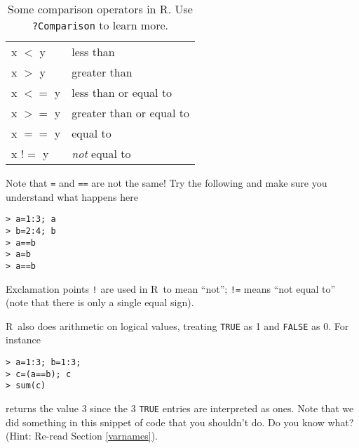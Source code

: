 \documentclass [11pt]{article}
\newcommand{\code}[1]{{\tt #1}}
\newcommand\R{{\sf R}}
\numberwithin{exercise}{section}
\begin{document}
\begin{table} [t]
\begin{tabular}{p{120pt}p{200pt}}
\hline
x $<$ y  & less than    \\
x $>$ y  & greater than \\
x $<=$ y & less than or equal to \\
x $>=$ y & greater than or equal to \\
x $==$ y & equal to \\
x $!=$ y & \emph{not} equal to \\
\hline 
\end{tabular}
\caption{Some comparison operators in \R. Use \code{?Comparison} to learn more.}
\label{Comparisons}
\end{table}

Note that \code{=} and \code{==} are not the same! Try the following and make sure you understand what happens here
\vspace{-0.1in}
\begin{verbatim}
> a=1:3; a
> b=2:4; b
> a==b
> a=b
> a==b
\end{verbatim}
\vspace{-0.1in}

Exclamation points \verb+!+ are used in \R\ to mean ``not''; 
\verb+!=+ means ``not equal to'' (note that there is only a single equal sign).

\R\ also does arithmetic on logical values, treating \code{TRUE} as 1 and 
\code{FALSE} as 0. For instance
\vspace{-0.1in}
\begin{verbatim}
> a=1:3; b=1:3;
> c=(a==b); c
> sum(c) 
\end{verbatim}
\vspace{-0.1in}
returns the value 3 since the 3 \code{TRUE} entries are interpreted as ones. 
Note that we did something in this snippet of code that you shouldn't do. Do you know what? (Hint: Re-read Section \ref{varnames}).
\end{document}
